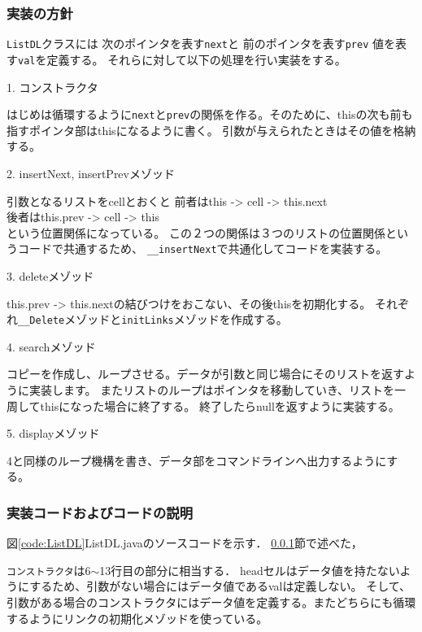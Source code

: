 \documentclass[10.5pt,a4paper]{jsarticle}
\newcommand{\figref}[1]{図\ref{#1}}
\newcommand{\secref}[1]{\ref{#1}節}
\begin{document}
\subsubsection{実装の方針}\label{sec:bs_impl_policy}

\texttt{ListDL}クラスには
次のポインタを表す\texttt{next}と
前のポインタを表す\texttt{prev}
値を表す\texttt{val}を定義する。
それらに対して以下の処理を行い実装をする。

1. コンストラクタ

はじめは循環するように\texttt{next}と\texttt{prev}の関係を作る。そのために、thisの次も前も指すポインタ部はthisになるように書く。
引数が与えられたときはその値を格納する。

2. insertNext, insertPrevメゾッド

引数となるリストをcellとおくと
前者はthis -> cell -> this.next\\
後者はthis.prev -> cell -> this\\
という位置関係になっている。
この２つの関係は３つのリストの位置関係というコードで共通するため、
\texttt{\_\_insertNext}で共通化してコードを実装する。

3. deleteメゾッド

this.prev -> this.nextの結びつけをおこない、その後thisを初期化する。
それぞれ\texttt{\_\_Delete}メゾッドと\texttt{initLinks}メゾッドを作成する。

4. searchメゾッド

コピーを作成し、ループさせる。データが引数と同じ場合にそのリストを返すように実装します。
またリストのループはポインタを移動していき、リストを一周してthisになった場合に終了する。
終了したらnullを返すように実装する。

5. displayメゾッド

4と同様のループ機構を書き、データ部をコマンドラインへ出力するようにする。

\subsubsection{実装コードおよびコードの説明}

\figref{code:ListDL}ListDL.javaのソースコードを示す．
\secref{sec:bs_impl_policy}で述べた，

\texttt{コンストラクタ}は6$\sim$13行目の部分に相当する．
headセルはデータ値を持たないようにするため、引数がない場合にはデータ値であるvalは定義しない。
そして、引数がある場合のコンストラクタにはデータ値を定義する。またどちらにも循環するようにリンクの初期化メゾッドを使っている。
\end{document}
